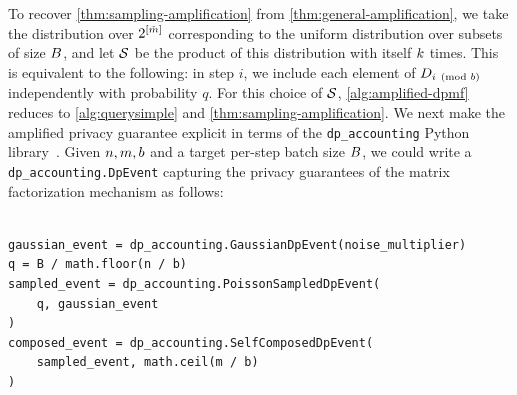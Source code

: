 \documentclass{article}
\begin{document}
 To recover \cref{thm:sampling-amplification} from \cref{thm:general-amplification}, we take the distribution over $2^{[\check{m}]}$ corresponding to the uniform distribution over subsets of size $B$, and let $\mathcal{S}$ be the product of this distribution with itself $k$ times. This is equivalent to the following: in step $i$, we include each element of $D_{i \pmod {b}}$ independently with probability $q$. For this choice of $\mathcal{S}$, \cref{alg:amplified-dpmf} reduces to \cref{alg:querysimple} and \cref{thm:sampling-amplification}. We next make the amplified privacy guarantee explicit in terms of the \texttt{dp\_accounting} Python library~\citep{pldlib}. Given $n, m, b$ and a target per-step batch size $B$, we could write a \texttt{dp\_accounting.DpEvent} capturing the privacy guarantees of the matrix factorization mechanism as follows:

\begin{example}
\begin{verbatim}

gaussian_event = dp_accounting.GaussianDpEvent(noise_multiplier)
q = B / math.floor(n / b)
sampled_event = dp_accounting.PoissonSampledDpEvent(
    q, gaussian_event
)
composed_event = dp_accounting.SelfComposedDpEvent(
    sampled_event, math.ceil(m / b)
)
\end{verbatim}
\label{ex:accounting}
\end{example}


\end{document}
